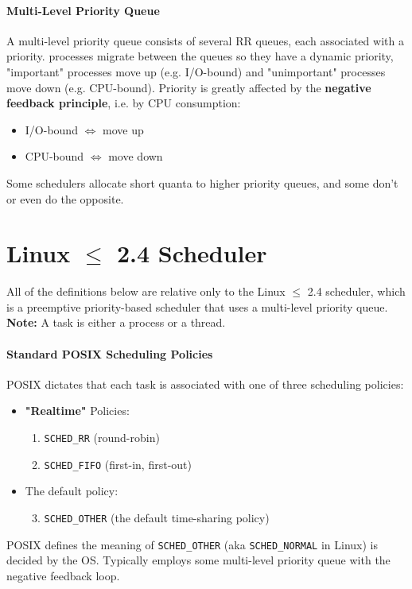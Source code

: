 \documentclass[openany,12pt]{book}
\newcommand{\code}[1]{\texttt{#1}}
\begin{document}
\paragraph{Multi-Level Priority Queue} A multi-level priority queue consists of several RR queues, each associated with a priority. processes migrate between the queues so they have a dynamic priority, "important" processes move up (e.g. I/O-bound) and "unimportant" processes move down (e.g. CPU-bound). Priority is greatly affected by the \textbf{negative feedback principle}, i.e. by CPU consumption:
\begin{itemize}
  \item I/O-bound \(\Longleftrightarrow\) move up
  \item CPU-bound \(\Longleftrightarrow\) move down
\end{itemize}
Some schedulers allocate short quanta to higher priority queues, and some don't or even do the opposite.



\section*{Linux \(\leq\) 2.4 Scheduler}
All of the definitions below are relative only to the Linux \(\leq\) 2.4 scheduler, which is a preemptive priority-based scheduler that uses a multi-level priority queue. \textbf{Note:} A task is either a process or a thread.

\paragraph{Standard POSIX Scheduling Policies} POSIX dictates that each task is associated with one of three scheduling policies:
\begin{itemize}
  \item \textbf{"Realtime"} Policies:
        \begin{enumerate}
          \item \code{SCHED\_RR} (round-robin)
          \item \code{SCHED\_FIFO} (first-in, first-out)
        \end{enumerate}
  \item The default policy:
        \begin{enumerate}
          \setcounter{enumi}{2}
          \item \code{SCHED\_OTHER} (the default time-sharing policy)
        \end{enumerate}
\end{itemize}
POSIX defines the meaning of \code{SCHED\_OTHER} (aka \code{SCHED\_NORMAL} in Linux) is decided by the OS. Typically employs some multi-level priority queue with the negative feedback loop.
\end{document}
